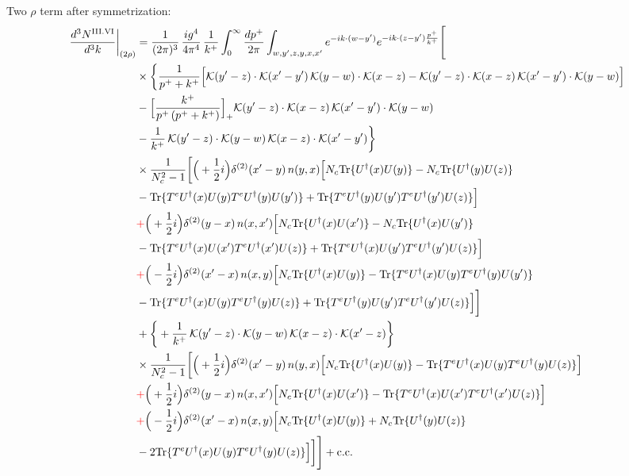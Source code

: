 \documentclass[9pt]{article}
\numberwithin{equation}{section}
\begin{document}
Two $\rho$ term after symmetrization: 
\begin{align}
\frac{d^{3}N^{\rm III.VI}}{d^{3}k}\bigg|_{(2\rho)}&=\frac{1}{(2\pi)^{3}}\,\frac{ig^{4}}{4\pi^{4}}\,\frac{1}{k^{+}}\int_{0}^{\infty}\frac{dp^{+}}{2\pi}\int_{w,y',z,y,x,x'}e^{-ik\cdot(w-y')}e^{-ik\cdot(z-y')\frac{p^{+}}{k^{+}}}\Bigg[\notag\\
&\times\bigg\{\frac{1}{p^{+}+k^{+}}\Big[\mathcal{K}(y'-z)\cdot\mathcal{K}(x'-y')\,\mathcal{K}(y-w)\cdot\mathcal{K}(x-z)-\mathcal{K}(y'-z)\cdot\mathcal{K}(x-z)\,\mathcal{K}(x'-y')\cdot\mathcal{K}(y-w)\Big]\notag\\
&-\Big[\frac{k^{+}}{p^{+}\,(p^{+}+k^{+})}\Big]_{+}\mathcal{K}(y'-z)\cdot\mathcal{K}(x-z)\,\mathcal{K}(x'-y')\cdot\mathcal{K}(y-w)\notag\\
&-\frac{1}{k^{+}}\,\mathcal{K}(y'-z)\cdot\mathcal{K}(y-w)\,\mathcal{K}(x-z)\cdot\mathcal{K}(x'-y')\bigg\}\notag\\
&\times \frac{1}{N_{c}^{2}-1}\bigg[\Big(+\frac{1}{2}i\Big)\delta^{(2)}(x'-y)\,n(y,x)\Big[N_{c}{\rm Tr}\{U^{\dagger}(x)U(y)\}-N_{c}{\rm Tr}\{U^{\dagger}(y)U(z)\}\notag\\
& -{\rm Tr}\{T^{e}U^{\dagger}(x)U(y)T^{e}U^{\dagger}(y)U(y')\}+{\rm Tr}\{T^{e}U^{\dagger}(y)U(y')T^{e}U^{\dagger}(y')U(z)\}\Big]\notag\\
& {\color{red}+}\Big(+\frac{1}{2}i\Big)\delta^{(2)}(y-x)\,n(x,x')\Big[N_{c}{\rm Tr}\{U^{\dagger}(x)U(x')\}-N_{c}{\rm Tr}\{U^{\dagger}(x)U(y')\}\notag\\
& -{\rm Tr}\{T^{e}U^{\dagger}(x)U(x')T^{e}U^{\dagger}(x')U(z)\}+{\rm Tr}\{T^{e}U^{\dagger}(x)U(y')T^{e}U^{\dagger}(y')U(z)\}\Big]\notag\\
& {\color{red}+}\Big(-\frac{1}{2}i\Big)\delta^{(2)}(x'-x)\,n(x,y)\Big[N_{c}{\rm Tr}\{U^{\dagger}(x)U(y)\}-{\rm Tr}\{T^{e}U^{\dagger}(x)U(y)T^{e}U^{\dagger}(y)U(y')\}\notag\\
& -{\rm Tr}\{T^{e}U^{\dagger}(x)U(y)T^{e}U^{\dagger}(y)U(z)\}+{\rm Tr}\{T^{e}U^{\dagger}(y)U(y')T^{e}U^{\dagger}(y')U(z)\}\Big]\bigg]\notag\\
&+\bigg\{+\frac{1}{k^{+}}\,\mathcal{K}(y'-z)\cdot\mathcal{K}(y-w)\,\mathcal{K}(x-z)\cdot\mathcal{K}(x'-z)\bigg\}\notag\\
&\times \frac{1}{N_{c}^{2}-1}\bigg[\Big(+\frac{1}{2}i\Big)\delta^{(2)}(x'-y)\,n(y,x)\Big[N_{c}{\rm Tr}\{U^{\dagger}(x)U(y)\}-{\rm Tr}\{T^{e}U^{\dagger}(x)U(y)T^{e}U^{\dagger}(y)U(z)\}\Big]\notag\\
& {\color{red}+}\Big(+\frac{1}{2}i\Big)\delta^{(2)}(y-x)\,n(x,x')\Big[N_{c}{\rm Tr}\{U^{\dagger}(x)U(x')\}-{\rm Tr}\{T^{e}U^{\dagger}(x)U(x')T^{e}U^{\dagger}(x')U(z)\}\Big]\notag\\
& {\color{red}+}\Big(-\frac{1}{2}i\Big)\delta^{(2)}(x'-x)\,n(x,y)\Big[N_{c}{\rm Tr}\{U^{\dagger}(x)U(y)\}+N_{c}{\rm Tr}\{U^{\dagger}(y)U(z)\}\notag\\
& -2{\rm Tr}\{T^{e}U^{\dagger}(x)U(y)T^{e}U^{\dagger}(y)U(z)\}\Big]\bigg]\Bigg]+{\rm c.c.}\label{eq:E-III.VI-2}
\end{align}
\end{document}
